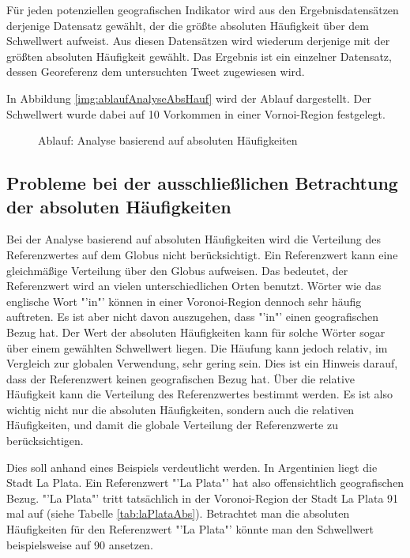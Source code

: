 				Für jeden potenziellen geografischen Indikator wird aus den Ergebnisdatensätzen derjenige Datensatz gewählt, der die größte absoluten Häufigkeit über dem Schwellwert aufweist.
				Aus diesen Datensätzen wird wiederum derjenige mit der größten absoluten Häufigkeit gewählt. 
				Das Ergebnis ist ein einzelner Datensatz, dessen Georeferenz dem untersuchten Tweet zugewiesen wird.

				In Abbildung \ref{img:ablaufAnalyseAbsHauf} wird der Ablauf dargestellt.
				Der Schwellwert wurde dabei auf 10 Vorkommen in einer Vornoi-Region festgelegt. 
				
				\begin{figure}[!ht]
	
						\centering
						\caption{Ablauf: Analyse basierend auf absoluten Häufigkeiten}
						\label{img:absHaufBsp}
					
				\end{figure}

		\subsection{Probleme bei der ausschließlichen Betrachtung der absoluten Häufigkeiten} 

			Bei der Analyse basierend auf absoluten Häufigkeiten wird die Verteilung des Referenzwertes auf dem Globus nicht berücksichtigt.
			Ein Referenzwert kann eine gleichmäßige Verteilung über den Globus aufweisen.
			Das bedeutet, der Referenzwert wird an vielen unterschiedlichen Orten benutzt. 
			Wörter wie das englische Wort "'in"' können in einer Voronoi-Region dennoch sehr häufig auftreten. 
			Es ist aber nicht davon auszugehen, dass "'in"' einen geografischen Bezug hat.  
			Der Wert der absoluten Häufigkeiten kann für solche Wörter sogar über einem gewählten Schwellwert liegen.
			Die Häufung kann jedoch relativ, im Vergleich zur globalen Verwendung, sehr gering sein.
			Dies ist ein Hinweis darauf, dass der Referenzwert keinen geografischen Bezug hat.
			Über die relative Häufigkeit kann die Verteilung des Referenzwertes bestimmt werden. 
			Es ist also wichtig nicht nur die absoluten Häufigkeiten, sondern auch die relativen Häufigkeiten, und damit die globale Verteilung der Referenzwerte zu berücksichtigen.

			Dies soll anhand eines Beispiels verdeutlicht werden.
			In Argentinien liegt die Stadt La Plata. 
			Ein Referenzwert "'La Plata"' hat also offensichtlich geografischen Bezug.
			"'La Plata"' tritt tatsächlich in der Voronoi-Region der Stadt La Plata 91 mal auf (siehe Tabelle \ref{tab:laPlataAbs}).			 
			Betrachtet man die absoluten Häufigkeiten für den Referenzwert "'La Plata"' könnte man den Schwellwert beispielsweise auf 90 ansetzen.


